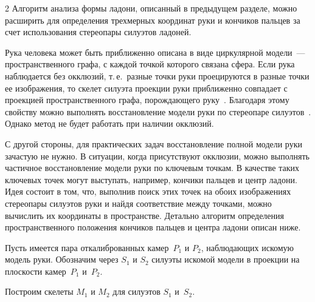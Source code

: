 \begin{multicols}{2}
Алгоритм анализа формы ладони, описанный в предыдущем разделе,
можно расширить для определения трехмерных координат руки и 
кончиков пальцев за счет использования стереопары силуэтов ладоней.

Рука человека может быть приближенно описана в виде циркулярной модели~--- 
пространственного графа, с каждой точкой которого связана сфера.
Если рука наблюдается без окклюзий, т.\,е.\ разные точки руки проецируются в 
разные точки ее изображения,
то скелет силуэта проекции руки приближенно совпадает с проекцией 
пространственного графа, порождающего руку~\cite{GeneralizedCylinders1995}.
Благодаря этому свойству можно выполнять восстановление модели руки по 
стереопаре силуэтов~\cite{Tsiskaridze2009, Tsiskaridze2010}.
Однако метод не будет работать при наличии окклюзий.

С другой стороны, для практических задач восстановление полной модели руки зачастую не нужно.
В ситуации, когда присутствуют окклюзии, можно выполнять частичное восстановление 
модели руки по ключевым точкам.
В качестве таких ключевых точек могут выступать, например, кончики пальцев и центр ладони.
Идея состоит в том, что, выполнив поиск этих точек на обоих изображениях стереопары 
силуэтов руки и найдя соответствие между точками, можно вычислить их координаты в пространстве.
Детально алгоритм определения пространственного положения кончиков пальцев и центра ладони 
описан ниже.

Пусть имеется пара откалиброванных камер~$P_1$ и $P_2$, наблюдающих искомую модель руки.
Обозначим через $S_1$ и $S_2$ силуэты искомой модели в проекции на плоскости камер~$P_1$ 
и~$P_2$.

Построим скелеты $M_1$ и $M_2$ для силуэтов $S_1$ и~$S_2$.

\setcounter{figure}{4}
\begin{figure}[b] %
 \vspace*{6pt}
 \begin{center}
 \mbox{%
 \epsfxsize=136.269mm
 }
 \end{center}
 \vspace*{-9pt}
 \vspace*{15pt}
 \begin{center}
 \mbox{%
 \epsfxsize=162.029mm
 }
 \end{center}
 \vspace*{-9pt}
\end{figure}


\end{multicols}
